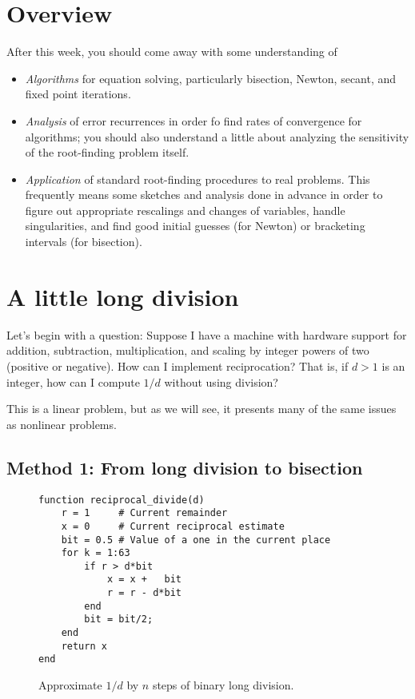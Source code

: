 \documentclass[12pt, leqno]{article}
\begin{document}

\section{Overview}

After this week, you should come away with some understanding of
\begin{itemize}
\item {\em Algorithms} for equation solving, particularly bisection,
  Newton, secant, and fixed point iterations.
\item {\em Analysis} of error recurrences in order fo find rates of
  convergence for algorithms; you should also understand a little
  about analyzing the sensitivity of the root-finding problem itself.
\item {\em Application} of standard root-finding procedures to real
  problems.  This frequently means some sketches and analysis done in
  advance in order to figure out appropriate rescalings and changes of
  variables, handle singularities, and find good initial guesses (for
  Newton) or bracketing intervals (for bisection).
\end{itemize}


\section{A little long division}

Let's begin with a question: Suppose I have a machine with hardware
support for addition, subtraction, multiplication, and scaling by
integer powers of two (positive or negative).  How can I implement
reciprocation?  That is, if $d > 1$ is an integer, how can I compute
$1/d$ without using division?

This is a linear problem, but as we will see, it presents many of
the same issues as nonlinear problems.

\subsection{Method 1: From long division to bisection}

\begin{figure}
\begin{lstlisting}
function reciprocal_divide(d)
    r = 1     # Current remainder
    x = 0     # Current reciprocal estimate
    bit = 0.5 # Value of a one in the current place
    for k = 1:63
        if r > d*bit
            x = x +   bit
            r = r - d*bit
        end
        bit = bit/2;
    end
    return x
end
\end{lstlisting}
\caption{Approximate $1/d$ by $n$ steps of binary long division.}
\label{fig-division}
\end{figure}
\end{document}
